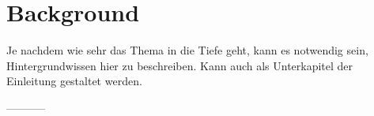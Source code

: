 \chapter{Background}
\label{chap:background}
Je nachdem wie sehr das Thema in die Tiefe geht, kann es notwendig sein, Hintergrundwissen hier zu beschreiben. Kann auch als Unterkapitel der Einleitung gestaltet werden.

-----------
\newline







